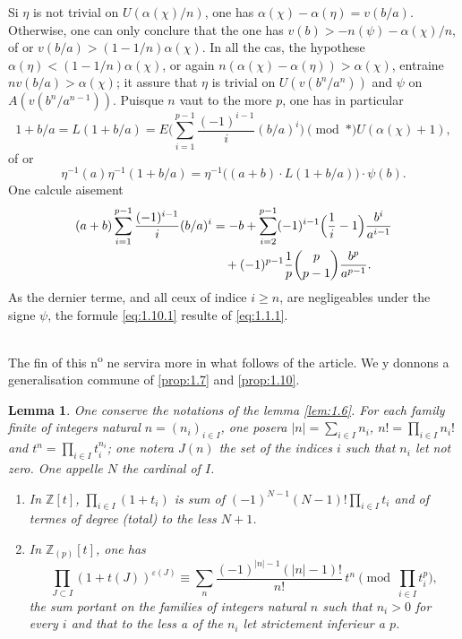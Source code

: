 \documentclass[12pt,a4paper]{article}
\theoremstyle{plain}
\newtheorem{lemma}[theorem]{Lemma}
\theoremstyle{definition}
\theoremstyle{remark}
\newcommand{\bZ}{\mathbb{Z}}
\begin{document}
Si $\eta$ is not trivial on $U(\alpha(\chi)/n)$, one has $\alpha(\chi) - \alpha(\eta) = v(b/a)$. Otherwise, one can only conclure that the one has $v(b) > -n(\psi) - \alpha(\chi)/n$, of or $v(b/a) > (1-1/n)\alpha(\chi)$. In all the cas, the hypothese $\alpha(\eta) < (1-1/n)\alpha(\chi)$, or again $n(\alpha(\chi) - \alpha(\eta)) > \alpha(\chi)$, entraine $nv(b/a) > \alpha(\chi)$; it assure that $\eta$ is trivial on $U(v(b^n/a^n))$ and $\psi$ on $A(v(b^n/a^{n-1}))$. Puisque $n$ vaut to the more $p$, one has in particular
\[
1 + b/a = L(1+b/a) = E\biggl(\sum_{i=1}^{p-1} \frac{(-1)^{i-1}}{i} (b/a)^i\biggr) \pmod{*} U(\alpha(\chi)+1),
\]
of or
\[
\eta^{-1}(a)\eta^{-1}(1+b/a) = \eta^{-1}\bigl((a+b) \cdot L(1+b/a)\bigr) \cdot \psi(b).
\]
One calcule aisement
\begin{align*}
(a+b) \sum_{i=1}^{p-1} \frac{(-1)^{i-1}}{i} (b/a)^i &= -b + \sum_{i=2}^{p-1} (-1)^{i-1}\Bigl(\frac{1}{i} - 1\Bigr) \frac{b^i}{a^{i-1}} \\
&\quad + (-1)^{p-1}\frac{1}{p}\binom{p}{p-1}\frac{b^p}{a^{p-1}}.
\end{align*}
As the dernier terme, and all ceux of indice $i \geq n$, are negligeables under the signe $\psi$, the formule \eqref{eq:1.10.1} resulte of \eqref{eq:1.1.1}.

\subsection{}
\label{sec:1.11}

The fin of this n\textsuperscript{o} ne servira more in what follows of the article. We y donnons a generalisation commune of \ref{prop:1.7} and \ref{prop:1.10}.

\begin{lemma}\label{lem:1.11}
One conserve the notations of the lemma \ref{lem:1.6}. For each family finite of integers natural $n = (n_i)_{i \in I}$, one posera $|n| = \sum_{i \in I} n_i$, $n! = \prod_{i \in I} n_i!$ and $t^n = \prod_{i \in I} t_i^{n_i}$; one notera $J(n)$ the set of the indices $i$ such that $n_i$ let not zero. One appelle $N$ the cardinal of $I$.
\begin{enumerate}[label=(\roman*)]
\item In $\bZ[t]$, $\prod_{i \in I}(1+t_i)$ is sum of $(-1)^{N-1}(N-1)! \prod_{i \in I} t_i$ and of termes of degree (total) to the less $N+1$.
\item In $\bZ_{(p)}[t]$, one has
\begin{equation}\label{eq:1.11.1}
\prod_{J \subset I}(1+t(J))^{\varepsilon(J)} \equiv \sum_n \frac{(-1)^{|n|-1}(|n|-1)!}{n!} \, t^n \pmod{\prod_{i \in I} t_i^p},
\end{equation}
the sum portant on the families of integers natural $n$ such that $n_i > 0$ for every $i$ and that to the less a of the $n_i$ let strictement inferieur a $p$.
\end{enumerate}
\end{lemma}
\end{document}
